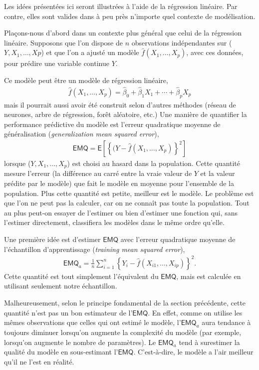 \documentclass[
]{book}
\theoremstyle{definition}
\theoremstyle{definition}
\theoremstyle{definition}
\theoremstyle{remark}
\begin{document}
Les idées présentées ici seront illustrées à l'aide de la régression linéaire. Par contre, elles sont valides dans à peu près n'importe quel contexte de modélisation.

Plaçons-nous d'abord dans un contexte plus général que celui de la régression linéaire. Supposons que l'on dispose de \(n\) observations indépendantes sur (\(Y, X_1, \ldots, Xp\)) et que l'on a ajusté un modèle \(\widehat{f}(X_1, \ldots, X_p)\), avec ces données, pour prédire une variable continue \(Y\).

Ce modèle peut être un modèle de régression linéaire,
\begin{align*}
\widehat{f}(X_1, \ldots, X_p) = \widehat{\beta}_0 + \widehat{\beta}_1X_1 + \cdots + \widehat{\beta}_pX_p
\end{align*}
mais il pourrait aussi avoir été construit selon d'autres méthodes (réseau de neurones, arbre de régression, forêt aléatoire, etc.) Une manière de quantifier la performance prédictive du modèle est l'erreur quadratique moyenne de généralisation (\emph{generalization mean squared error}),
\begin{align*}
\mathsf{EMQ}=\mathsf{E}\left[\left\{(Y-\widehat{f}(X_1, \ldots, X_p)\right\}^2\right]
\end{align*}
lorsque (\(Y, X_1, \ldots, X_p\)) est choisi au hasard dans la population. Cette quantité mesure l'erreur (la différence au carré entre la vraie valeur de \(Y\) et la valeur prédite par le modèle) que fait le modèle en moyenne pour l'ensemble de la population. Plus cette quantité est petite, meilleur est le modèle. Le problème est que l'on ne peut pas la calculer, car on ne connaît pas toute la population. Tout au plus peut-on essayer de l'estimer ou bien d'estimer une fonction qui, sans l'estimer directement, classifiera les modèles dans le même ordre qu'elle.

Une première idée est d'estimer \(\mathsf{EMQ}\) avec l'erreur quadratique moyenne de l'échantillon d'apprentissage (\emph{training mean squared error}),
\begin{align*}
\mathsf{EMQ}_a= \frac{1}{n}\sum_{i=1}^n \left\{Y_i-\widehat{f}(X_{i1}, \ldots, X_{ip})\right\}^2.
\end{align*}
Cette quantité est tout simplement l'équivalent du \(\mathsf{EMQ}\), mais est calculée en utilisant seulement notre échantillon.

Malheureusement, selon le principe fondamental de la section précédente, cette quantité n'est pas un bon estimateur de l'\(\mathsf{EMQ}\). En effet, comme on utilise les mêmes observations que celles qui ont estimé le modèle, l'\(\mathsf{EMQ}_a\) aura tendance à toujours diminuer lorsqu'on augmente la complexité du modèle (par exemple, lorsqu'on augmente le nombre de paramètres). Le \(\mathsf{EMQ}_a\) tend à surestimer la qualité du modèle en sous-estimant l'\(\mathsf{EMQ}\). C'est-à-dire, le modèle a l'air meilleur qu'il ne l'est en réalité.
\end{document}
